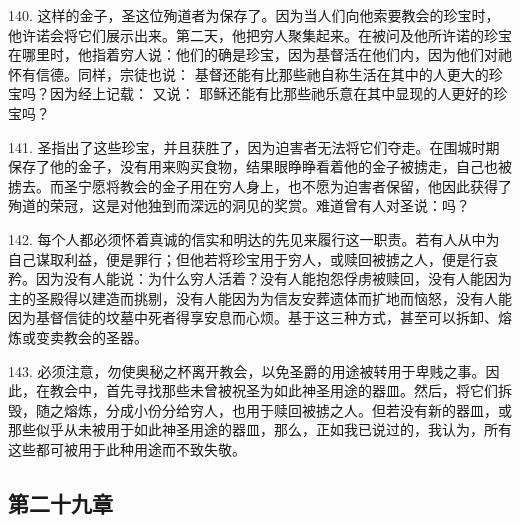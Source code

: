 140. 这样的金子，圣这位殉道者为保存了。因为当人们向他索要教会的珍宝时，他许诺会将它们展示出来。第二天，他把穷人聚集起来。在被问及他所许诺的珍宝在哪里时，他指着穷人说：他们的确是珍宝，因为基督活在他们内，因为他们对祂怀有信德。同样，宗徒也说： 基督还能有比那些祂自称生活在其中的人更大的珍宝吗？因为经上记载： 又说： 耶稣还能有比那些祂乐意在其中显现的人更好的珍宝吗？\par

141. 圣指出了这些珍宝，并且获胜了，因为迫害者无法将它们夺走。在围城时期保存了他的金子，没有用来购买食物，结果眼睁睁看着他的金子被掳走，自己也被掳去。而圣宁愿将教会的金子用在穷人身上，也不愿为迫害者保留，他因此获得了殉道的荣冠，这是对他独到而深远的洞见的奖赏。难道曾有人对圣说：吗？\par

142. 每个人都必须怀着真诚的信实和明达的先见来履行这一职责。若有人从中为自己谋取利益，便是罪行；但他若将珍宝用于穷人，或赎回被掳之人，便是行哀矜。因为没有人能说：为什么穷人活着？没有人能抱怨俘虏被赎回，没有人能因为主的圣殿得以建造而挑剔，没有人能因为为信友安葬遗体而扩地而恼怒，没有人能因为基督信徒的坟墓中死者得享安息而心烦。基于这三种方式，甚至可以拆卸、熔炼或变卖教会的圣器。\par

143. 必须注意，勿使奥秘之杯离开教会，以免圣爵的用途被转用于卑贱之事。因此，在教会中，首先寻找那些未曾被祝圣为如此神圣用途的器皿。然后，将它们拆毁，随之熔炼，分成小份分给穷人，也用于赎回被掳之人。但若没有新的器皿，或那些似乎从未被用于如此神圣用途的器皿，那么，正如我已说过的，我认为，所有这些都可被用于此种用途而不致失敬。\par


\subsection{第二十九章}

\par

